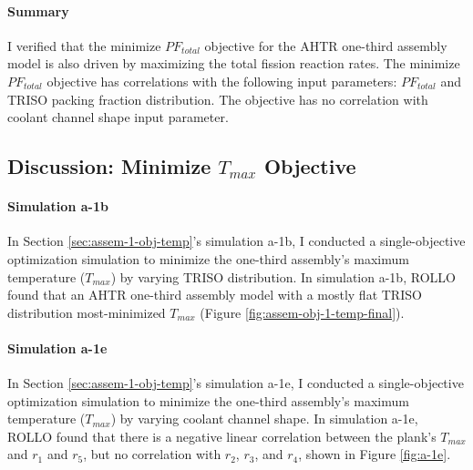 \paragraph{Summary}
I verified that the minimize $PF_{total}$ objective for the \gls{AHTR} one-third assembly 
model is also driven by maximizing the total fission reaction rates. 
The minimize $PF_{total}$ objective has correlations with the following input parameters: 
$PF_{total}$ and TRISO packing fraction distribution. 
The objective has no correlation with coolant channel shape input parameter. 

\subsection{Discussion: Minimize $T_{max}$ Objective}
\label{sec:assem-discussion-temp}

\paragraph{Simulation a-1b}
In Section \ref{sec:assem-1-obj-temp}'s simulation a-1b, I conducted a single-objective 
optimization simulation to minimize the one-third assembly's maximum temperature 
($T_{max}$) by varying TRISO distribution. 
In simulation a-1b, \gls{ROLLO} found that an \gls{AHTR} one-third assembly model with 
a mostly flat TRISO distribution most-minimized $T_{max}$ 
(Figure \ref{fig:assem-obj-1-temp-final}).

\paragraph{Simulation a-1e}
In Section \ref{sec:assem-1-obj-temp}'s simulation a-1e, I conducted a single-objective 
optimization simulation to minimize the one-third assembly's maximum temperature 
($T_{max}$) by varying coolant channel shape. 
In simulation a-1e, \gls{ROLLO} found that there is a negative linear correlation 
between the plank's $T_{max}$ and $r_1$ and $r_5$, but no correlation with 
$r_2$, $r_3$, and $r_4$, shown in Figure \ref{fig:a-1e}. 

